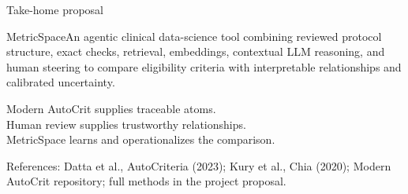 \documentclass[aspectratio=169,10pt]{beamer}
\newcommand{\source}[1]{{\tiny\color{muted}#1}}
\begin{document}
\begin{frame}{Take-home proposal}
\begin{block}{MetricSpace}An agentic clinical data-science tool combining reviewed protocol structure, exact checks, retrieval, embeddings, contextual LLM reasoning, and human steering to compare eligibility criteria with interpretable relationships and calibrated uncertainty.\end{block}
\vspace{1em}\begin{center}\large Modern AutoCrit supplies traceable atoms.\\[.45em]Human review supplies trustworthy relationships.\\[.45em]MetricSpace learns and operationalizes the comparison.\end{center}
\vfill\source{References: Datta et al., AutoCriteria (2023); Kury et al., Chia (2020); Modern AutoCrit repository; full methods in the project proposal.}
\end{frame}
\end{document}
